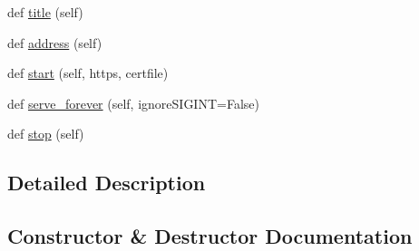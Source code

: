 \begin{DoxyCompactItemize}
\item 
def \hyperlink{classremi_1_1server_1_1Server_a2e53f38dc0ced2c472d662d7dce195da}{title} (self)
\item 
def \hyperlink{classremi_1_1server_1_1Server_a10d27f58025a2343347abc999b523773}{address} (self)
\item 
def \hyperlink{classremi_1_1server_1_1Server_a442c9f9b26e9c9bd5049461a25a21430}{start} (self, https, certfile)
\item 
def \hyperlink{classremi_1_1server_1_1Server_a4ac0544b43e4fd854c931a86656ce2de}{serve\+\_\+forever} (self, ignore\+S\+I\+G\+I\+NT=False)
\item 
def \hyperlink{classremi_1_1server_1_1Server_a9650d8044020da20f309c5922e15a292}{stop} (self)
\end{DoxyCompactItemize}


\subsection{Detailed Description}
\begin{DoxyVerb}\end{DoxyVerb}
 

\subsection{Constructor \& Destructor Documentation}

